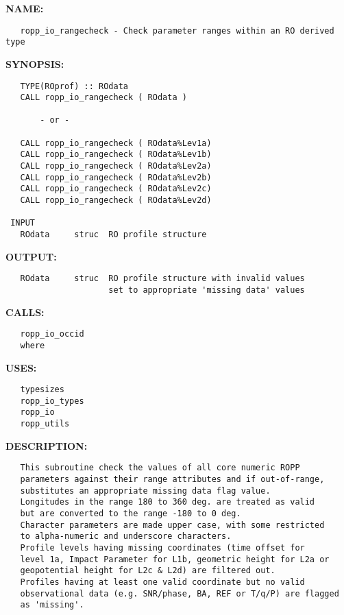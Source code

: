\label{ch:robo71}
\label{ch:Initialisation_ropp_io_rangecheck}
\textbf{NAME:}\hspace{0.08in}\begin{Verbatim}
   ropp_io_rangecheck - Check parameter ranges within an RO derived type
\end{Verbatim}
\textbf{SYNOPSIS:}\hspace{0.08in}\begin{Verbatim}
   TYPE(ROprof) :: ROdata
   CALL ropp_io_rangecheck ( ROdata )

       - or -

   CALL ropp_io_rangecheck ( ROdata%Lev1a)
   CALL ropp_io_rangecheck ( ROdata%Lev1b)
   CALL ropp_io_rangecheck ( ROdata%Lev2a)
   CALL ropp_io_rangecheck ( ROdata%Lev2b)
   CALL ropp_io_rangecheck ( ROdata%Lev2c)
   CALL ropp_io_rangecheck ( ROdata%Lev2d)

 INPUT
   ROdata     struc  RO profile structure
\end{Verbatim}
\textbf{OUTPUT:}\hspace{0.08in}\begin{Verbatim}
   ROdata     struc  RO profile structure with invalid values
                     set to appropriate 'missing data' values
\end{Verbatim}
\textbf{CALLS:}\hspace{0.08in}\begin{Verbatim}
   ropp_io_occid
   where
\end{Verbatim}
\textbf{USES:}\hspace{0.08in}\begin{Verbatim}
   typesizes
   ropp_io_types
   ropp_io
   ropp_utils
\end{Verbatim}
\textbf{DESCRIPTION:}\hspace{0.08in}\begin{Verbatim}
   This subroutine check the values of all core numeric ROPP
   parameters against their range attributes and if out-of-range,
   substitutes an appropriate missing data flag value.
   Longitudes in the range 180 to 360 deg. are treated as valid
   but are converted to the range -180 to 0 deg.
   Character parameters are made upper case, with some restricted
   to alpha-numeric and underscore characters.
   Profile levels having missing coordinates (time offset for
   level 1a, Impact Parameter for L1b, geometric height for L2a or
   geopotential height for L2c & L2d) are filtered out.
   Profiles having at least one valid coordinate but no valid
   observational data (e.g. SNR/phase, BA, REF or T/q/P) are flagged
   as 'missing'.
\end{Verbatim}
